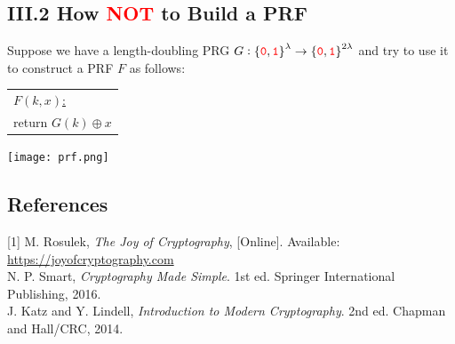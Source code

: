 \documentclass[a0,portrait]{a0poster}
\newcommand{\zero}{\textcolor{red}{\texttt{0}}}
\newcommand{\one}{\textcolor{red}{\texttt{1}}}
\newcommand{\tab}{\hspace{12pt}}
\newcommand{\xor}{\oplus}
\newcommand{\binaryfield}{\set{\zero,\one}}
\begin{document}
\begin{multicols}{2}
		\begin{sectionbox}
			\section*{\LARGE\textcolor{MainColor}{III.2 How \textcolor{red}{NOT} to Build a PRF}}\large
			Suppose we have a length-doubling PRG $
			G:\binaryfield^{\lambda}\to\binaryfield^{2\lambda}
			$ and try to use it to construct a PRF $F$ as follows:
			\begin{center}
				\begin{tabular}{|l|}
					\hline
					\underline{$F(k,x)$:}\\
					\tab return $G(k)\xor x$\\
					\hline
				\end{tabular}
			\end{center}
			\begin{center}
				\begin{minipage}{\textwidth}\centering
					\texttt{[image: prf.png]}
				\end{minipage}
			\end{center}
		\end{sectionbox}
		
		\begin{sectionbox}
			\section*{\LARGE\textcolor{MainColor}{References}}
			[1] M. Rosulek, \textit{The Joy of Cryptography}, [Online]. Available: \url{https://joyofcryptography.com}\\
			\text{[2]} N. P. Smart, \textit{Cryptography Made Simple}. 1st ed. Springer International Publishing, 2016.\\
			\text{[3]} J. Katz and Y. Lindell, \textit{Introduction to Modern Cryptography}. 2nd ed. Chapman and Hall/CRC, 2014.
		\end{sectionbox}
	\end{multicols}
	
\end{document}
